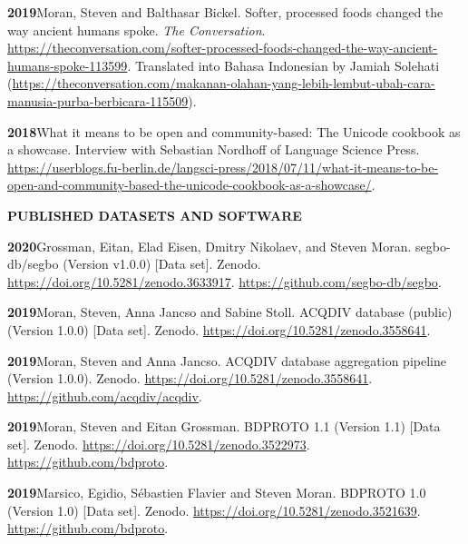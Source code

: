 \documentclass[11pt]{article}
\newcommand{\hangpara}{
 \setlength{\parindent}{0in} %
 \hangindent=0.42in %
}
\begin{document}
\hangpara
\vskip 6pt
{\bf 2019}\hspace{1ex}Moran, Steven and Balthasar Bickel. Softer, processed foods changed the way ancient humans spoke. \textit{The Conversation}. \url{https://theconversation.com/softer-processed-foods-changed-the-way-ancient-humans-spoke-113599}. Translated into Bahasa Indonesian by Jamiah Solehati (\url{https://theconversation.com/makanan-olahan-yang-lebih-lembut-ubah-cara-manusia-purba-berbicara-115509}).

\hangpara
\vskip 6pt {\bf 2018}\hspace{1ex}What it means to be open and community-based: The Unicode cookbook as a showcase. Interview with Sebastian Nordhoff of Language Science Press. \url{https://userblogs.fu-berlin.de/langsci-press/2018/07/11/what-it-means-to-be-open-and-community-based-the-unicode-cookbook-as-a-showcase/}.


\vskip 20pt
\begin{flushleft}
{\bf PUBLISHED DATASETS AND SOFTWARE}
\end{flushleft}

\hangpara
{\bf 2020}\hspace{1ex}Grossman, Eitan, Elad Eisen, Dmitry Nikolaev, and Steven Moran. segbo-db/segbo (Version v1.0.0) [Data set]. Zenodo. \url{https://doi.org/10.5281/zenodo.3633917}. \url{https://github.com/segbo-db/segbo}.

\vskip 6pt
\hangpara
{\bf 2019}\hspace{1ex}Moran, Steven, Anna Jancso and Sabine Stoll. ACQDIV database (public) (Version 1.0.0) [Data set]. Zenodo. \url{https://doi.org/10.5281/zenodo.3558641}.

\vskip 6pt
\hangpara
{\bf 2019}\hspace{1ex}Moran, Steven and Anna Jancso. ACQDIV database aggregation pipeline (Version 1.0.0). Zenodo. \url{https://doi.org/10.5281/zenodo.3558641}. \url{https://github.com/acqdiv/acqdiv}.

\vskip 6pt
\hangpara
{\bf 2019}\hspace{1ex}Moran, Steven and Eitan Grossman. BDPROTO 1.1 (Version 1.1) [Data set]. Zenodo. \url{https://doi.org/10.5281/zenodo.3522973}. \url{https://github.com/bdproto}.

\vskip 6pt
\hangpara
{\bf 2019}\hspace{1ex}Marsico, Egidio, Sébastien Flavier and Steven Moran. BDPROTO 1.0 (Version 1.0) [Data set]. Zenodo. \url{https://doi.org/10.5281/zenodo.3521639}. \url{https://github.com/bdproto}.
\end{document}
